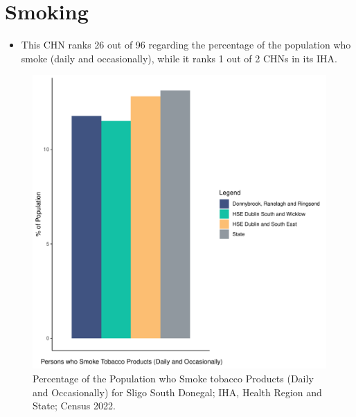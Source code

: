 \documentclass{article}
\begin{document}
\pagebreak

\section{Smoking}\label{sect:Smoking}
\begin{itemize}
\item This CHN ranks  26 out of 96 regarding the percentage of the population who smoke (daily and occasionally), while it ranks   1 out of 2 CHNs in its IHA.
\end{itemize}
\begin{figure}[H]
	\centering
	\includegraphics[width = 120mm]{../figures/SmokingED.pdf}
	\caption{Percentage of the Population who Smoke tobacco Products (Daily and Occasionally) for Sligo South Donegal; IHA, Health Region and State; Census 2022.}
	\label{fig:2ae19629-1a6a-13a3-e055-000000000001}
	\end{figure}
	
\end{document}
